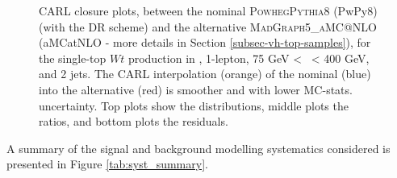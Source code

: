 \begin{figure}[!htbp]
    \centering
      \caption{CARL closure plots, between the nominal \textsc{Powheg}\textsc{Pythia}8 (PwPy8) (with the DR scheme) and the alternative \textsc{MadGraph5\_aMC@NLO} (aMCatNLO - more details in Section \ref{subsec-vh-top-samples}), for the single-top $Wt$ production in \vhb, 1-lepton, 75 GeV < \ptv\ < 400 GeV, and 2 jets. The CARL interpolation (orange) of the nominal (blue) into the alternative (red) is smoother and with lower MC-stats. uncertainty. Top plots show the distributions, middle plots the ratios, and bottom plots the residuals.}
      \label{fig:carl:resolved_closure_stopWt}
  \end{figure}
  
  A summary of the signal and background modelling systematics considered is presented in Figure \ref{tab:syst_summary}.


